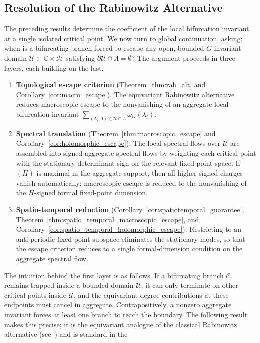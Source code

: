 \documentclass[twoside,11pt]{article}
\def\bc{{\mathbb{C}}}
\begin{document}
\subsection{Resolution of the Rabinowitz Alternative}
\label{sec:unbounded_branches}
The preceding results determine the coefficient of the local bifurcation invariant at a single isolated critical point. We now turn to global continuation, asking: when is a bifurcating branch forced to escape any open, bounded $G$-invariant domain $\mathcal U \subset \bc \times \mathscr H$ satisfying $\partial \mathcal U \cap \Lambda = \emptyset$? The argument proceeds in three layers, each building on the last. 
\begin{enumerate}
    \item \textbf{Topological escape criterion} (Theorem~\ref{thm:rab_alt} and Corollary~\ref{cor:macro_escape}). The equivariant Rabinowitz alternative reduces macroscopic escape to the nonvanishing of an aggregate local bifurcation invariant $\sum_{(\lambda_i,0) \in \mathcal U \cap \Lambda} \omega_G(\lambda_i)$.
    \item \textbf{Spectral translation} (Theorem~\ref{thm:macroscopic_escape} and Corollary~\ref{cor:holomorphic_escape}). The local spectral flows over $\mathcal U$ are assembled into signed aggregate spectral flows by weighting each critical point with the stationary determinant sign on the relevant fixed-point space. If $(H)$ is maximal in the aggregate support, then all higher signed charges vanish automatically; macroscopic escape is reduced to the nonvanishing of the $H$-signed formal fixed-point dimension.
     \item \textbf{Spatio-temporal reduction} (Corollary~\ref{cor:spatiotemporal_guarantee}, Theorem~\ref{thm:spatio_temporal_macroscopic_escape}, and Corollary~\ref{cor:spatio_temporal_holomorphic_escape}). Restricting to an anti-periodic fixed-point subspace eliminates the stationary modes, so that the escape criterion reduces to a single formal-dimension condition on the aggregate spectral flow. 
\end{enumerate}
The intuition behind the first layer is as follows. If a bifurcating branch $\mathscr C$ remains trapped inside a bounded domain $\mathcal U$, it can only terminate on other critical points inside $\mathcal U$, and the equivariant degree contributions at these endpoints must cancel in aggregate. Contrapositively, a nonzero aggregate invariant
forces at least one branch to reach the boundary. The following result makes this precise; it is the equivariant analogue of the classical  Rabinowitz alternative (see~\cite{Rabinowitz}) and is standard in the 
\end{document}
